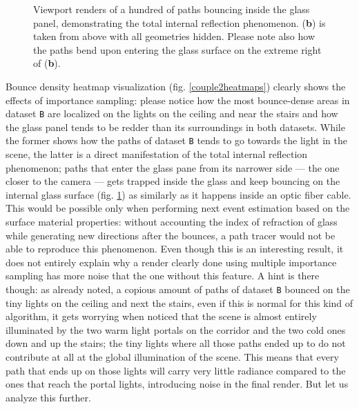 \begin{figure}
	\caption{Viewport renders of a hundred of paths bouncing inside the glass panel, demonstrating the total internal reflection phenomenon. (\textbf{b}) is taken from above with all geometries hidden. Please note also how the paths bend upon entering the glass surface on the extreme right of (\textbf{b}).}
	\label{opticfiber}
\end{figure}

Bounce density heatmap visualization (fig. \ref{couple2heatmaps}) clearly shows the effects of importance sampling: please notice how the most bounce-dense areas in dataset \texttt{B} are localized on the lights on the ceiling and near the stairs and how the glass panel tends to be redder than its surroundings in both datasets. While the former shows how the paths of dataset \texttt{B} tends to go towards the light in the scene, the latter is a direct manifestation of the total internal reflection phenomenon; paths that enter the glass pane from its narrower side --- the one closer to the camera --- gets trapped inside the glass and keep bouncing on the internal glass surface (fig. \ref{opticfiber}) as similarly as it happens inside an optic fiber cable. This would be possible only when performing next event estimation based on the surface material properties: without accounting the index of refraction of glass while generating new directions after the bounces, a path tracer would not be able to reproduce this phenomenon. Even though this is an interesting result, it does not entirely explain why a render clearly done using multiple importance sampling has more noise that the one without this feature. A hint is there though: as already noted, a copious amount of paths of dataset \texttt{B} bounced on the tiny lights on the ceiling and next the stairs, even if this is normal for this kind of algorithm, it gets worrying when noticed that the scene is almost entirely illuminated by the two warm light portals on the corridor and the two cold ones down and up the stairs; the tiny lights where all those paths ended up to do not contribute at all at the global illumination of the scene. This means that every path that ends up on those lights will carry very little radiance compared to the ones that reach the portal lights, introducing noise in the final render. But let us analyze this further.

